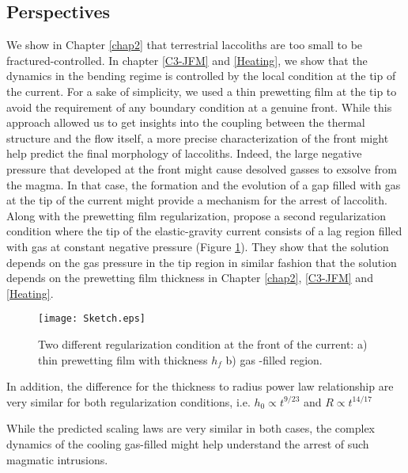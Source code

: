 \subsection*{Perspectives}
\label{sec:perspectives}

We show  in Chapter  \ref{chap2} that  terrestrial laccoliths  are too
small  to  be  fractured-controlled.    In  chapter  \ref{C3-JFM}  and
\ref{Heating},  we show  that the  dynamics in  the bending  regime is
controlled by  the local condition at  the tip of the  current.  For a
sake of simplicity, we used a thin prewetting film at the tip to avoid
the requirement  of any boundary  condition at a genuine  front. While
this approach allowed us to get insights into the coupling between the
thermal structure and the flow itself, a more precise characterization
of   the  front   might   help  predict   the   final  morphology   of
laccoliths. Indeed, the large negative  pressure that developed at the
front might cause desolved gasses to  exsolve from the magma.  In that
case, the formation and the evolution of  a gap filled with gas at the
tip  of the  current  might  provide a  mechanism  for  the arrest  of
laccolith.    Along   with   the   prewetting   film   regularization,
\citet{Anonymous:QWXp_4JV} propose  a second  regularization condition
where the tip of the elastic-gravity  current consists of a lag region
filled   with    gas   at    constant   negative    pressure   (Figure
\ref{C7-Sketch}).   They show  that the  solution depends  on the  gas
pressure  in the  tip  region  in similar  fashion  that the  solution
depends  on  the prewetting  film  thickness  in Chapter  \ref{chap2},
\ref{C3-JFM} and \ref{Heating}.
\begin{figure}[htpb]
  \begin{center}
    \graphicspath{ {/Users/thorey/Documents/These/Manuscript/Figure/Chapter7/} }
    \texttt{[image: Sketch.eps]}
    \caption{Two different  regularization condition  at the  front of
      the current: a) thin prewetting film with thickness $h_f$ b) gas
      -filled region.}
    \label{C7-Sketch}
  \end{center}
\end{figure}

In  addition, the  difference for  the thickness  to radius  power law
relationship  are very  similar  for  both regularization  conditions,
i.e. $h_0\propto t^{9/23}$ and $R \propto t^{14/17}$


While the predicted  scaling laws are very similar in  both cases, the
complex dynamics of  the cooling gas-filled might  help understand the
arrest of such magmatic intrusions.



